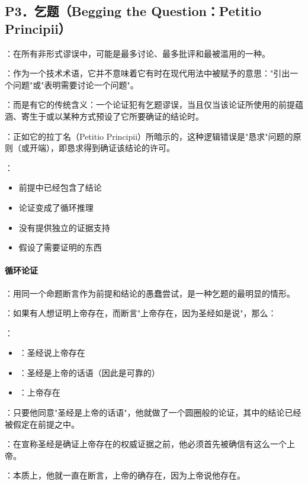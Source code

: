 \subsection{P3．乞题（Begging the Question：Petitio Principii）}

\begin{theorembox}[title=乞题谬误的定义与特征]
：在所有非形式谬误中，可能是最多讨论、最多批评和最被滥用的一种。

：作为一个技术术语，它并不意味着它有时在现代用法中被赋予的意思："引出一个问题"或"表明需要讨论一个问题"。

：而是有它的传统含义：一个论证犯有乞题谬误，当且仅当该论证所使用的前提蕴涵、寄生于或以某种方式预设了它所要确证的结论时。

：正如它的拉丁名（Petitio Principii）所暗示的，这种逻辑错误是"恳求"问题的原则（或开端），即恳求得到确证该结论的许可。

：
\begin{itemize}
  \item 前提中已经包含了结论
  \item 论证变成了循环推理
  \item 没有提供独立的证据支持
  \item 假设了需要证明的东西
\end{itemize}
\end{theorembox}

\paragraph{循环论证}
\begin{examplebox}[title=循环论证的典型例子]
：用同一个命题断言作为前提和结论的愚蠢尝试，是一种乞题的最明显的情形。

：如果有人想证明上帝存在，而断言"上帝存在，因为圣经如是说"，那么：

：
\begin{itemize}
  \item {}：圣经说上帝存在
  \item {}：圣经是上帝的话语（因此是可靠的）
  \item {}：上帝存在
\end{itemize}

：只要他同意"圣经是上帝的话语"，他就做了一个圆圈般的论证，其中的结论已经被假定在前提之中。

：在宣称圣经是确证上帝存在的权威证据之前，他必须首先被确信有这么一个上帝。

：本质上，他就一直在断言，上帝的确存在，因为上帝说他存在。
\end{examplebox}

